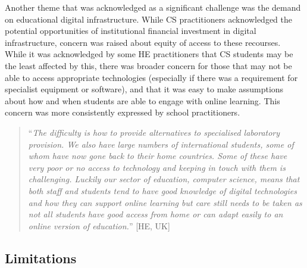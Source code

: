 \documentclass[conference]{IEEEtran}
\begin{document}
Another theme that was acknowledged as a significant challenge was the
demand on educational digital infrastructure. While CS practitioners
acknowledged the potential opportunities of institutional financial
investment in digital infrastructure, concern was raised about equity
of access to these recourses. While it was acknowledged by some HE
practitioners that CS students may be the least affected
by this, there was broader concern for those that may not be able to
access appropriate technologies (especially if there was a requirement
for specialist equipment or software), and that it was easy to make
assumptions about how and when students are able to engage with online
learning. This concern was more consistently expressed by school
practitioners.


\begin{quotation}
``{\emph{The difficulty is how to provide alternatives to specialised
laboratory provision. We also have large numbers of international
students, some of whom have now gone back to their home
countries. Some of these have very poor or no access to technology and
keeping in touch with them is challenging. Luckily our sector of
education, computer science, means that both staff and students tend
to have good knowledge of digital technologies and how they can
support online learning but care still needs to be taken as not all
students have good access from home or can adapt easily to an online
version of education.}}'' [HE, UK]
\end{quotation}

\subsection{Limitations}
\end{document}
